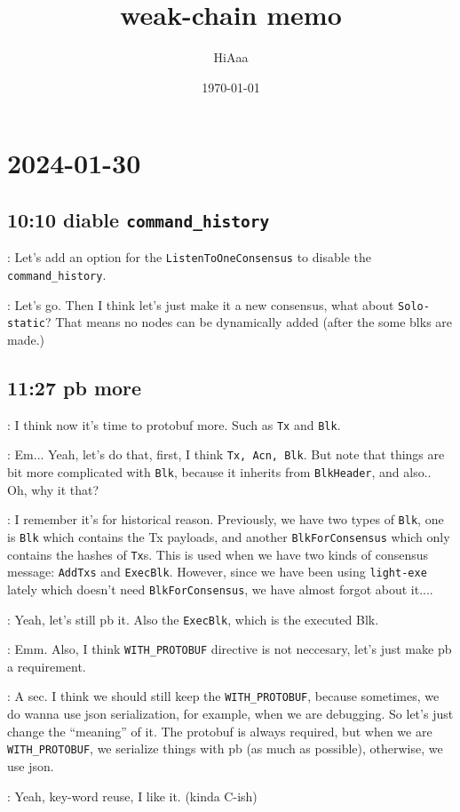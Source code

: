 \documentclass[dvipsnames]{article}
\title{weak-chain memo}
\date{\today}
\author{HiAaa}
\begin{document}
\maketitle
\tableofcontents{}
\newpage{}


\section*{2024-01-30}

\subsection*{10:10 diable \texttt{command\_history} \cola{[done at 11:26]}}

 : Let's add an option for the \texttt{ListenToOneConsensus} to
disable the \texttt{command\_history}.

 : Let's go. Then I think let's just make it a new consensus, what
about \texttt{Solo-static}? That means no nodes can be dynamically added (after
the some blks are made.)

\subsection*{11:27 pb more}

 : I think now it's time to protobuf more. Such as \texttt{Tx} and
\texttt{Blk}.

 : Em... Yeah, let's do that, first, I think \texttt{Tx, Acn,
  Blk}. But note that things are bit more complicated with \texttt{Blk}, because
it inherits from \texttt{BlkHeader}, and also.. Oh, why it that?

 : I remember it's for historical reason. Previously, we have two
types of \texttt{Blk}, one is \texttt{Blk} which contains the Tx payloads, and
another \texttt{BlkForConsensus} which only contains the hashes of \texttt{Tx}s.
This is used when we have two kinds of consensus message: \texttt{AddTxs} and
\texttt{ExecBlk}. However, since we have been using \texttt{light-exe} lately
which doesn't need \texttt{BlkForConsensus}, we have almost forgot about it....

 : Yeah, let's still pb it. Also the \texttt{ExecBlk}, which is
the executed Blk.

 : Emm. Also, I think \texttt{WITH\_PROTOBUF} directive is not
neccesary, let's just make pb a requirement.

 : A sec. I think we should still keep the
\texttt{WITH\_PROTOBUF}, because sometimes, we do wanna use json serialization,
for example, when we are debugging. So let's just change the ``meaning'' of it.
The protobuf is always required, but when we are \texttt{WITH\_PROTOBUF}, we
serialize things with pb (as much as possible), otherwise, we use json.

 : Yeah, key-word reuse, I like it. (kinda C-ish)
\end{document}
